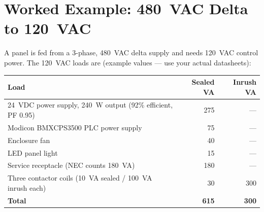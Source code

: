 \section{Worked Example: 480~VAC Delta to 120~VAC}
A panel is fed from a 3-phase, 480~VAC delta supply and needs 120~VAC control power. The 120~VAC loads are (example values --- use your actual datasheets):
\begin{center}
\small
\begin{tabular}{@{}lrr@{}}
\toprule
\rowcolor{tblhead}\textbf{Load} & \textbf{Sealed VA} & \textbf{Inrush VA} \\ \midrule
24~VDC power supply, 240~W output (92\% efficient, PF 0.95) & 275 & --- \\
Modicon BMXCPS3500 PLC power supply & 75 & --- \\
Enclosure fan & 40 & --- \\
LED panel light & 15 & --- \\
Service receptacle (NEC counts 180~VA) & 180 & --- \\
Three contactor coils (10~VA sealed / 100~VA inrush each) & 30 & 300 \\ \midrule
\textbf{Total} & \textbf{615} & \textbf{300} \\
\bottomrule
\end{tabular}
\end{center}

